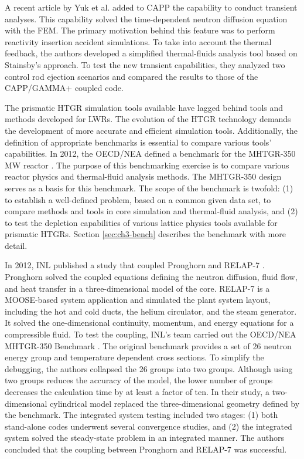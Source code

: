 A recent article by Yuk et al. \cite{yuk_time-dependent_2020} added to CAPP the capability to conduct transient analyses.
This capability solved the time-dependent neutron diffusion equation with the \gls{FEM}.
The primary motivation behind this feature was to perform reactivity insertion accident simulations.
To take into account the thermal feedback, the authors developed a simplified thermal-fluids analysis tool based on Stainsby's approach.
To test the new transient capabilities, they analyzed two control rod ejection scenarios and compared the results to those of the CAPP/GAMMA+ coupled code.

The prismatic HTGR simulation tools available have lagged behind tools and methods developed for \glspl{LWR}.
The evolution of the HTGR technology demands the development of more accurate and efficient simulation tools.
Additionally, the definition of appropriate benchmarks is essential to compare various tools' capabilities.
In 2012, the \gls{OECD}/\gls{NEA} defined a benchmark for the \gls{MHTGR}-350 MW reactor \cite{oecd_nea_benchmark_2017}.
The purpose of this benchmarking exercise is to compare various reactor physics and thermal-fluid analysis methods.
The MHTGR-350 design serves as a basis for this benchmark.
The scope of the benchmark is twofold: (1) to establish a well-defined problem, based on a common given data set, to compare methods and tools in core simulation and thermal-fluid analysis, and (2) to test the depletion capabilities of various lattice physics tools available for prismatic HTGRs.
Section \ref{sec:ch3-bench} describes the benchmark with more detail.

In 2012, \gls{INL} published a study \cite{j_ortensi_initial_2012} that coupled Pronghorn and RELAP-7 \cite{andrs_relap-7_2012}.
Pronghorn solved the coupled equations defining the neutron diffusion, fluid flow, and heat transfer in a three-dimensional model of the core.
RELAP-7 is a MOOSE-based system application and simulated the plant system layout, including the hot and cold ducts, the helium circulator, and the steam generator.
It solved the one-dimensional continuity, momentum, and energy equations for a compressible fluid.
To test the coupling, INL's team carried out the OECD/NEA MHTGR-350 Benchmark \cite{oecd_nea_coupled_2020}.
The original benchmark provides a set of 26 neutron energy group and temperature dependent cross sections.
To simplify the debugging, the authors collapsed the 26 groups into two groups.
Although using two groups reduces the accuracy of the model, the lower number of groups decreases the calculation time by at least a factor of ten.
In their study, a two-dimensional cylindrical model replaced the three-dimensional geometry defined by the benchmark.
The integrated system testing included two stages: (1) both stand-alone codes underwent several convergence studies, and (2) the integrated system solved the steady-state problem in an integrated manner.
The authors concluded that the coupling between Pronghorn and RELAP-7 was successful.

